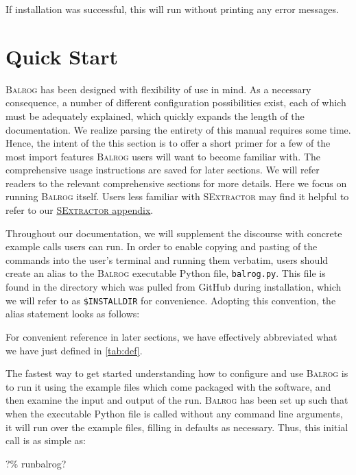 \documentclass[11pt]{book}
\newcommand{\codett}[1]{\texttt{#1}}
\newcommand{\py}{Python}
\newcommand{\balrog}{\textsc{Balrog}}
\newcommand{\sex}{\textsc{SExtractor}}
\newcommand{\bcmd}{\% runbalrog}
\begin{document}
\noindent If installation was successful, this will run without printing any error messages.

\chapter{Quick Start}
\label{sec:quick}

\balrog{} has been designed with flexibility of use in mind. As a necessary consequence, 
a number of different configuration possibilities exist, each of which must be
adequately explained, which quickly expands the length of the documentation.
We realize parsing the entirety of this manual requires some time.
Hence, the intent of the this section is to offer a short primer for a few of the most import features
\balrog{} users will want to become familiar with.
The comprehensive usage instructions are saved for later sections.
We will refer readers to the relevant comprehensive sections for more details.
Here we focus on running \balrog{} itself.
Users less familiar with \sex{} may find it helpful to refer to our \hyperref[sec:quicksex]{\sex{} appendix}.

Throughout our documentation, we will supplement the discourse with concrete example calls users can run.
In order to enable copying and pasting of the commands into the user's terminal and running them verbatim,
users should create an alias to the \balrog{} executable \py{} file, \codett{balrog.py}. 
This file is found in the directory which was pulled from GitHub during installation,
which we will refer to as \codett{\$INSTALLDIR} for convenience.
Adopting this convention, the alias statement looks as follows:

\begin{cmdline}
\end{cmdline}

\noindent For convenient reference in later sections, we have effectively 
abbreviated what we have just defined in \autoref{tab:def}.

The fastest way to get started understanding how to configure and use \balrog{} is to
run it using the example files which come packaged with the software, and then examine the input
and output of the run. 
\balrog{} has been set up such that when the executable \py{}
file is called without any command line arguments, it will run over
the example files, filling in defaults as necessary. 
Thus, this initial call is as simple as:

\begin{cmdline}
?\bcmd{}?
\end{cmdline}
\end{document}
